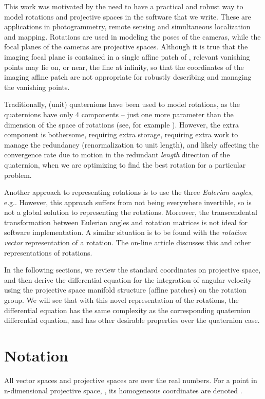 \documentclass{gen-j-l}
\theoremstyle{definition}
\theoremstyle{remark}
\numberwithin{equation}{section}
\begin{document}
This work was motivated by the need to have a practical and robust way to
model rotations and projective spaces in the software that we write. These
are applications in photogrammetry, remote sensing and simultaneous
localization and mapping.  Rotations are used in modeling the poses of the
cameras, while the focal planes of the cameras are projective spaces.  
Although it is true that the imaging focal plane is contained in a single 
affine patch 
of , relevant vanishing points may lie on, or near, the line at 
infinity, so that the coordinates of the imaging affine patch are not 
appropriate for robustly describing and managing the vanishing points.

Traditionally, (unit) quaternions have been used to model rotations,
as the quaternions have only 4 components -- just one more parameter
than the dimension of the space of rotations (see, for example
\cite{schultz06, rogers03}).  However, the extra component is
bothersome, requiring extra storage, requiring extra work to manage
the redundancy (renormalization to unit length), and likely affecting
the convergence rate due to motion in the redundant {\em length}
direction of the quaternion, when we are optimizing to find the best
rotation for a particular problem.

Another approach to representing
rotations is to use the three {\em Eulerian angles}, e.g.\cite{goldst50}.
However, this approach suffers from not being everywhere invertible, so
is not a global solution to representing the rotations.  Moreover, the
transcendental transformation between Eulerian angles and rotation 
matrices is not ideal for software implementation.  A similar situation
is to be found with the {\em rotation vector} representation of a rotation.
The on-line article \cite{wiki-rot} discusses this and other representations
of rotations.

In the following sections, we review the standard coordinates on
projective space, and then derive the differential equation for the
integration of angular velocity using the projective space manifold
structure (affine patches) on the rotation group.  
We will see that with this novel representation of the rotations,
the differential equation has the same
complexity as the corresponding quaternion differential equation, and
has other desirable properties over the quaternion case.

\section{Notation}
All vector spaces and projective spaces are over the real numbers.
For a point  in n-dimensional projective space, , its homogeneous
coordinates are denoted .
\end{document}
